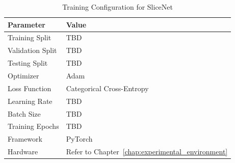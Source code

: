\documentclass[12pt,a4paper]{report}
\begin{document}
	\begin{table}[H]
		\centering
		\caption{Training Configuration for SliceNet}
		\label{tab:training}
		
		\begin{tabular}{|p{5cm}|p{6cm}|}
			\hline
			
			\textbf{Parameter} &
			\textbf{Value}
			\\
			\hline
			
			Training Split &
			TBD
			\\
			\hline
			
			Validation Split &
			TBD
			\\
			\hline
			
			Testing Split &
			TBD
			\\
			\hline
			
			Optimizer &
			Adam
			\\
			\hline
			
			Loss Function &
			Categorical Cross-Entropy
			\\
			\hline
			
			Learning Rate &
			TBD
			\\
			\hline
			
			Batch Size &
			TBD
			\\
			\hline
			
			Training Epochs &
			TBD
			\\
			\hline
			
			Framework &
			PyTorch
			\\
			\hline
			
			Hardware &
			Refer to Chapter~\ref{chap:experimental_environment}
			\\
			\hline
			
		\end{tabular}
		
	\end{table}
\end{document}
